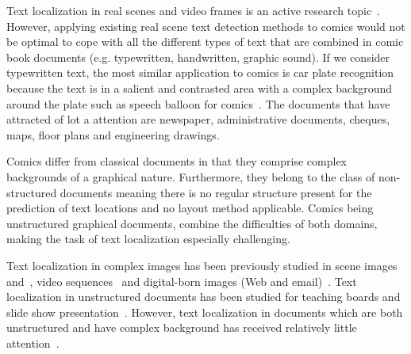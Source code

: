 
Text localization in real scenes and video frames is an active research topic~\cite{Jung04,ShahabICDAR2011Robust,KaratzasICDAR2013Robust}.
However, applying existing real scene text detection methods to comics would not be optimal to cope with all the different types of text that are combined in comic book documents (e.g. typewritten, handwritten, graphic sound).
If we consider typewritten text, the most similar application to comics is car plate recognition because the text is in a salient and contrasted area with a complex background around the plate such as speech balloon for comics~\cite{anagnostopoulos2008license}.
The documents that have attracted of lot a attention are newspaper, administrative documents, cheques, maps, floor plans and engineering drawings.

Comics differ from classical documents in that they comprise complex backgrounds of a graphical nature. Furthermore, they belong to the class of non-structured documents meaning there is no regular structure present for the prediction of text locations and no layout method applicable.
Comics being unstructured graphical documents, combine the difficulties of both domains, making the task of text localization especially challenging.

Text localization in complex images has been previously studied in scene images~\cite{Weinman09,Epshtein10,Neumann12} and~\cite{Wang10,Meng12}, video sequences~\cite{Wonjun09,Shivakumara09} and digital-born images (Web and email)~\cite{Karatzas07}. 
Text localization in unstructured documents has been studied for teaching boards and slide show presentation~\cite{Oliveira10,Vajda2012Method,Nguyen2013BagOfSubjects}.
However, text localization in documents which are both unstructured and have complex background has received relatively little attention~\cite{Clavelli09}.

